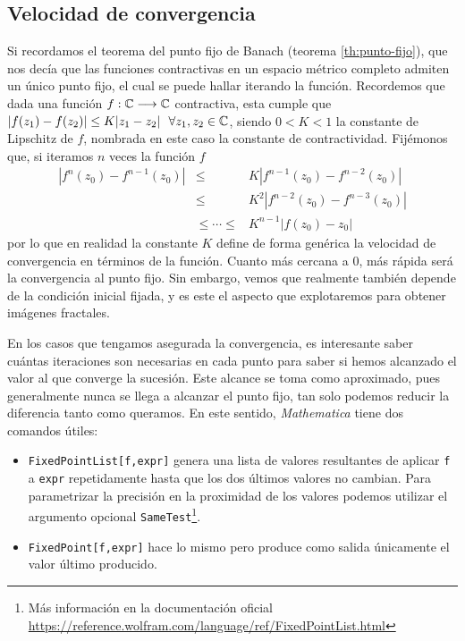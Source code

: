 \subsection{Velocidad de convergencia}

Si recordamos el teorema del punto fijo de Banach (teorema \ref{th:punto-fijo}), que nos decía que las funciones contractivas en un espacio métrico completo admiten un único punto fijo, el cual se puede hallar iterando la función. Recordemos que dada una función $f:\mathbb{C}\longrightarrow\mathbb{C}$ contractiva, esta cumple que $|f(z_1)-f(z_2)|\leq K|z_1-z_2|\ \ \forall z_1,z_2\in\C$, siendo $0<K<1$ la constante de Lipschitz de $f$, nombrada en este caso la constante de contractividad. Fijémonos que, si iteramos $n$ veces la función $f$
\begin{eqnarray*}
    |f^n(z_0)-f^{n-1}(z_0)| & \leq & K|f^{n-1}(z_0)-f^{n-2}(z_0)| \\
    & \leq & K^2 |f^{n-2}(z_0)-f^{n-3}(z_0)| \\
    & \leq\cdots\leq&K^{n-1}|f(z_0)-z_0|
\end{eqnarray*}
por lo que en realidad la constante $K$ define de forma genérica la velocidad de convergencia en términos de la función. Cuanto más cercana a $0$, más rápida será la convergencia al punto fijo. Sin embargo, vemos que realmente también depende de la condición inicial fijada, y es este el aspecto que explotaremos para obtener imágenes fractales. 

En los casos que tengamos asegurada la convergencia, es interesante saber cuántas iteraciones son necesarias en cada punto para saber si hemos alcanzado el valor al que converge la sucesión. Este alcance se toma como aproximado, pues generalmente nunca se llega a alcanzar el punto fijo, tan solo podemos reducir la diferencia tanto como queramos. En este sentido, \textit{Mathematica} tiene dos comandos útiles:

\begin{itemize}
    \item \verb|FixedPointList[f,expr]| genera una lista de valores resultantes de aplicar \verb|f| a \verb|expr| repetidamente hasta que los dos últimos valores no cambian. Para parametrizar la precisión en la proximidad de los valores podemos utilizar el argumento opcional \verb|SameTest|\footnote{Más información en la documentación oficial \url{https://reference.wolfram.com/language/ref/FixedPointList.html}}.
    \item \verb|FixedPoint[f,expr]| hace lo mismo pero produce como salida únicamente el valor último producido.
\end{itemize}

